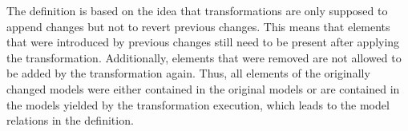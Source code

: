 The definition is based on the idea that transformations are only supposed to append changes but not to revert previous changes.
This means that elements that were introduced by previous changes still need to be present after applying the transformation.
Additionally, elements that were removed are not allowed to be added by the transformation again.
Thus, all elements of the originally changed models were either contained in the original models or are contained in the models yielded by the transformation execution, which leads to the model relations in the definition.


